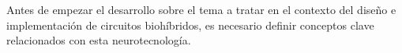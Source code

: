 Antes de empezar el desarrollo sobre el tema a tratar en el contexto del diseño e implementación de circuitos biohíbridos, es necesario definir conceptos clave relacionados con esta neurotecnología.
